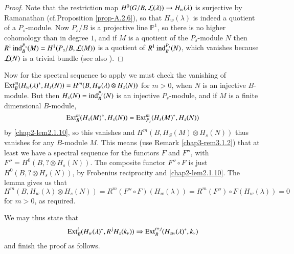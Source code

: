 \begin{proof}
Note that the restriction map $H^{0}(G/B,\mathcal{L}(\lambda))\to
H_{w}(\lambda)$ is surjective by Ramanathan (cf.\@ Proposition \ref{prop-A.2.6}),
so that $H_{w}(\lambda)$ is indeed a quotient of a $P_{s}$-module. Now
$P_{s}/B$ is a projective line $\mathbb{P}^{1}$, so there is no higher
cohomology than in degree $1$, and if $M$ is a quotient of the
$P_{s}$-module $N$ then
$R^{1}\operatorname{ind}^{P_{s}}_{B}(M)=H^{1}(P_{s}/B,\mathcal{L}(M))$ is a quotient of
$R^{1}\operatorname{ind}^{P_{s}}_{B}(N)$, which vanishes because $\mathcal{L}(N)$ is a
trivial bundle (see also \cite{key7}).
\end{proof}

Now for the spectral sequence to apply we must check the vanishing of
$\operatorname{Ext}^{m}_{B}(H_{w}(\lambda)^{*},H_{s}(N))=H^{m}(B,H_{w}(\lambda)\otimes
H_{s}(N))$ for $m>0$, when $N$ is an injective $B$-module. But then
$H_{s}(N)=\operatorname{ind}^{P_{s}}_{B}(N)$ is an injective $P_{s}$-module, and if
$M$ is a finite dimensional $B$-module,
$$
\operatorname{Ext}^{m}_{B}(H_{s}(M)^{*},H_{s}(N))=\operatorname{Ext}^{m}_{P_{s}}(H_{s}(M)^{*},H_{s}(N))
$$
by \ref{chap2-lem2.1.10}, so this vanishes and
$H^{m}(B,H_{S}(M)\otimes H_{s}(N))$ thus vanishes for any $B$-module
$M$. This means (use Remark \ref{chap3-rem3.1.2}) that\pageoriginale
at\label{page27} least we have a spectral sequence for the functors $F$ and $F''$,
with $F''=H^{0}(B,?\otimes H_{s}(N))$. The composite functor $F''\circ
F$ is just $H^{0}(B,?\otimes H_{s}(N))$, by Frobenius reciprocity and
\ref{chap2-lem2.1.10}. The lemma gives us that
$H^{m}(B,H_{w}(\lambda)\otimes H_{s}(N))=R^{m}(F''\circ
F)(H_{w}(\lambda))=R^{m}(F'')\circ F(H_{w}(\lambda))=0$ for $m>0$, as
required. 

We may thus state that
$$
\operatorname{Ext}^{i}_{B}(H_{w}(\lambda)^{*},R^{j}H_{s}(k_{\nu}))\Rightarrow
\operatorname{Ext}^{i+j}_{B}(H_{sw}(\lambda)^{*},k_{\nu}) 
$$
and finish the proof as follows.

